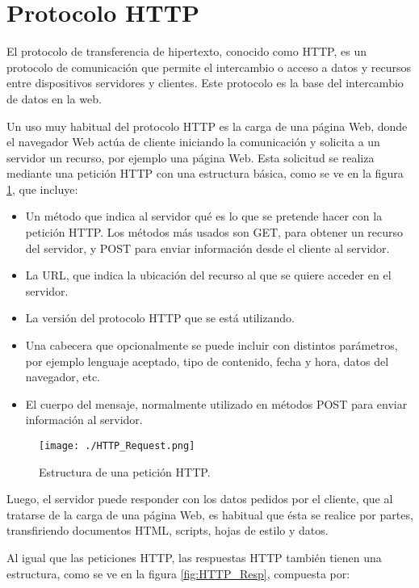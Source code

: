 \section{Protocolo HTTP}

El protocolo de transferencia de hipertexto, conocido como HTTP, es un protocolo de comunicación que permite el intercambio o acceso a datos y recursos entre dispositivos servidores y clientes. Este protocolo es la base del intercambio de datos en la web\citep{HTTPWIKI}.
 
Un uso muy habitual del protocolo HTTP es la carga de una página Web, donde el navegador Web actúa de cliente iniciando la comunicación y solicita a un servidor un recurso, por ejemplo una página Web. Esta solicitud se realiza mediante una petición HTTP con una estructura básica, como se ve en la figura \ref{fig:HTTP_Req}, que incluye:
\begin{itemize}
	\item Un método que indica al servidor qué es lo que se pretende hacer con la petición HTTP\citep{HTTPMOZI}. Los métodos más usados son GET, para obtener un recurso del servidor, y POST para enviar información desde el cliente al servidor.
	\item La URL, que indica la ubicación del recurso al que se quiere acceder en el servidor.
	\item La versión del protocolo HTTP que se está utilizando.
	\item Una cabecera que opcionalmente se puede incluir con distintos parámetros, por ejemplo lenguaje aceptado, tipo de contenido, fecha y hora, datos del navegador, etc. 
	\item El cuerpo del mensaje, normalmente utilizado en métodos POST para enviar información al servidor.
\end{itemize}

\begin{figure}[H]
	\centering
	\texttt{[image: ./HTTP\_Request.png]}
	\caption{Estructura de una petición HTTP.\protect\footnotemark}
	\label{fig:HTTP_Req}
\end{figure}


Luego, el servidor puede responder con los datos pedidos por el cliente, que al tratarse de la carga de una página Web, es habitual que ésta se realice por partes, transfiriendo documentos HTML, scripts, hojas de estilo y datos.

Al igual que las peticiones HTTP, las respuestas HTTP también tienen una estructura, como se ve en la figura \ref{fig:HTTP_Resp}, compuesta por:

